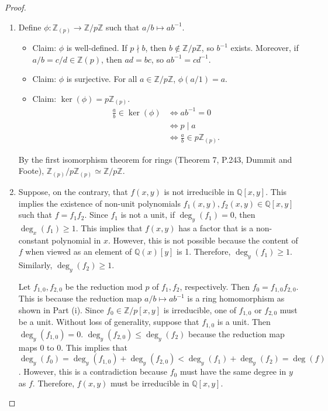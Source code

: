 \documentclass[12pt, psamsfonts]{amsart}
\theoremstyle{definition}
\theoremstyle{remark}
\numberwithin{equation}{section}
\begin{document}
\begin{proof}
  $ $
  \begin{enumerate}[label=(\roman*)]
    \item
      Define $\phi: \mathbb{Z}_{(p)} \rightarrow \mathbb{Z}/p\mathbb{Z}$ such that $a / b \mapsto ab^{-1}$.
      \begin{itemize}
        \item
          Claim: $\phi$ is well-defined.
          If $p \nmid b$, then $b \notin \mathbb{Z}/p\mathbb{Z}$, so $b^{-1}$ exists.
          Moreover, if $a / b = c / d \in \mathbb{Z}(p)$, then $ad = bc$, so $ab^{-1} = cd^{-1}$.
        \item
          Claim: $\phi$ is surjective.
          For all $a \in \mathbb{Z}/p\mathbb{Z}$, $\phi(a / 1) = a$.
        \item
          Claim: $\ker(\phi) = p\mathbb{Z}_{(p)}$.
          \begin{align*}
            \frac{a}{b} \in \ker(\phi)
              &\iff ab^{-1} = 0 \\
              &\iff p \mid a \\
              &\iff \frac{a}{b} \in p\mathbb{Z}_{(p)}.
          \end{align*}
      \end{itemize}
      By the first isomorphism theorem for rings (Theorem 7, P.243, Dummit and Foote), $\mathbb{Z}_{(p)} / p\mathbb{Z}_{(p)} \simeq \mathbb{Z}/p\mathbb{Z} $.
    \item
      Suppose, on the contrary, that $f(x, y)$ is not irreducible in $\mathbb{Q}[x, y]$.
      This implies the existence of non-unit polynomials $f_1(x, y), f_2(x, y) \in \mathbb{Q}[x, y]$ such that $f = f_1f_2$. 
      Since $f_1$ is not a unit, if $\deg_y(f_1) = 0$, then $\deg_x(f_1) \geq 1$.
      This implies that $f(x, y)$ has a factor that is a non-constant polynomial in $x$.
      However, this is not possible because the content of $f$ when viewed as an element of $\mathbb{Q}(x)[y]$ is 1.
      Therefore, $\deg_y(f_1) \geq 1$.
      Similarly, $\deg_y(f_2) \geq 1$.

      Let $f_{1, 0}, f_{2, 0}$ be the reduction mod $p$ of $f_1, f_2$, respectively.
      Then $f_0 = f_{1, 0}f_{2, 0}$.
      This is because the reduction map $a/b \mapsto ab^{-1}$ is a ring homomorphism as shown in Part (i).
      Since $f_0 \in \mathbb{Z}/p[x, y]$ is irreducible, one of $f_{1, 0}$ or $f_{2, 0}$ must be a unit.
      Without loss of generality, suppose that $f_{1, 0}$ is a unit.
      Then $\deg_y(f_{1, 0}) = 0$.
      $\deg_y(f_{2, 0}) \leq \deg_y(f_2)$ because the reduction map maps 0 to 0.
      This implies that $\deg_y(f_0) = \deg_y(f_{1, 0}) + \deg_y(f_{2, 0}) < \deg_y(f_1) + \deg_y(f_2) = \deg(f)$.
      However, this is a contradiction because $f_0$ must have the same degree in $y$ as $f$.
      Therefore, $f(x, y)$ must be irreducible in $\mathbb{Q}[x, y]$.
  \end{enumerate}
\end{proof}
\end{document}
